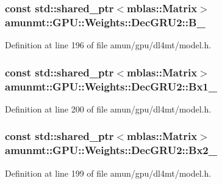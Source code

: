 \subsubsection[{\texorpdfstring{B\+\_\+}{B_}}]{\setlength{\rightskip}{0pt plus 5cm}const std\+::shared\+\_\+ptr$<${\bf mblas\+::\+Matrix}$>$ amunmt\+::\+G\+P\+U\+::\+Weights\+::\+Dec\+G\+R\+U2\+::\+B\+\_\+}\hypertarget{structamunmt_1_1GPU_1_1Weights_1_1DecGRU2_a16a2d7b99972539f42e4fce9550e0449}{}\label{structamunmt_1_1GPU_1_1Weights_1_1DecGRU2_a16a2d7b99972539f42e4fce9550e0449}


Definition at line 196 of file amun/gpu/dl4mt/model.\+h.

\subsubsection[{\texorpdfstring{Bx1\+\_\+}{Bx1_}}]{\setlength{\rightskip}{0pt plus 5cm}const std\+::shared\+\_\+ptr$<${\bf mblas\+::\+Matrix}$>$ amunmt\+::\+G\+P\+U\+::\+Weights\+::\+Dec\+G\+R\+U2\+::\+Bx1\+\_\+}\hypertarget{structamunmt_1_1GPU_1_1Weights_1_1DecGRU2_a7913455128492f8f775458a9204d4121}{}\label{structamunmt_1_1GPU_1_1Weights_1_1DecGRU2_a7913455128492f8f775458a9204d4121}


Definition at line 200 of file amun/gpu/dl4mt/model.\+h.

\subsubsection[{\texorpdfstring{Bx2\+\_\+}{Bx2_}}]{\setlength{\rightskip}{0pt plus 5cm}const std\+::shared\+\_\+ptr$<${\bf mblas\+::\+Matrix}$>$ amunmt\+::\+G\+P\+U\+::\+Weights\+::\+Dec\+G\+R\+U2\+::\+Bx2\+\_\+}\hypertarget{structamunmt_1_1GPU_1_1Weights_1_1DecGRU2_a38de14ea94716e2728b9b641dbd2a85a}{}\label{structamunmt_1_1GPU_1_1Weights_1_1DecGRU2_a38de14ea94716e2728b9b641dbd2a85a}


Definition at line 199 of file amun/gpu/dl4mt/model.\+h.

